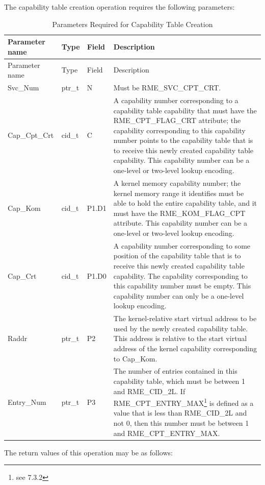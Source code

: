 The capability table creation operation requires the following parameters:

\begin{xltabular}{\textwidth}{@{}>{\hsize\raggedright\arraybackslash}X>{\hsize\raggedright\arraybackslash}X>{\hsize\raggedright\arraybackslash}X>{\hsize\raggedright\arraybackslash}X@{}}
\caption{Parameters Required for Capability Table Creation}\label{tab:2-5-create-capability-table-parameters}\\
\toprule
Parameter name & Type & Field & Description\tabularnewline
\endfirsthead
\toprule
Parameter name & Type & Field & Description\tabularnewline
\midrule
\endhead
\bottomrule
\endlastfoot
Svc\_Num & ptr\_t & N & Must be RME\_SVC\_CPT\_CRT.\tabularnewline
Cap\_Cpt\_Crt & cid\_t & C &
A capability number corresponding to a capability table capability that must have the RME\_CPT\_FLAG\_CRT attribute; the capability corresponding to this capability number points to the capability table that is to receive this newly created capability table capability. This capability number can be a one-level or two-level lookup encoding.\tabularnewline
Cap\_Kom & cid\_t & P1.D1 &
A kernel memory capability number; the kernel memory range it identifies must be able to hold the entire capability table, and it must have the RME\_KOM\_FLAG\_CPT attribute. This capability number can be a one-level or two-level lookup encoding.\tabularnewline
Cap\_Crt & cid\_t & P1.D0 &
A capability number corresponding to some position of the capability table that is to receive this newly created capability table capability. The capability corresponding to this capability number must be empty. This capability number can only be a one-level lookup encoding.\tabularnewline
Raddr & ptr\_t & P2 &
The kernel-relative start virtual address to be used by the newly created capability table. This address is relative to the start virtual address of the kernel capability corresponding to Cap\_Kom.\tabularnewline
Entry\_Num & ptr\_t & P3 &
The number of entries contained in this capability table, which must be between 1 and RME\_CID\_2L. If RME\_CPT\_ENTRY\_MAX\footnote{see 7.3.2} is defined as a value that is less than RME\_CID\_2L and not 0, then this number must be between 1 and RME\_CPT\_ENTRY\_MAX.\tabularnewline
\end{xltabular}
\nopagebreak[4]

The return values of this operation may be as follows:

